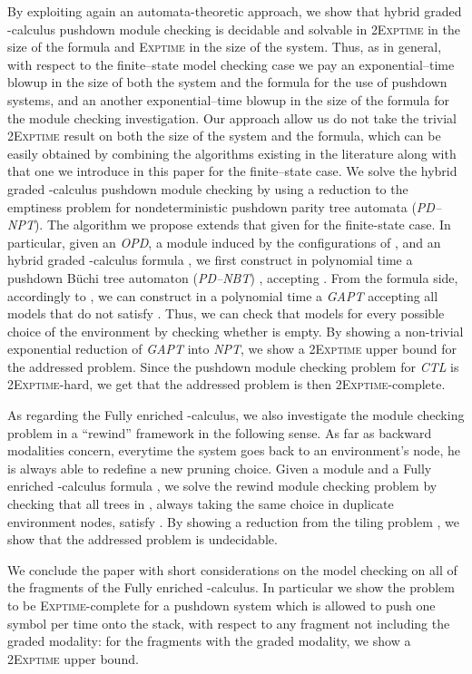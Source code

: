 \documentclass{LMCS}
\theoremstyle{plain}
\def \CTL           {\emph{CTL}\xspace}
\def \EXPTIME       {\textsc{Exptime}\xspace}
\def \GAPT          {\emph{GAPT}\xspace}
\def \NPT           {\emph{NPT}\xspace}
\def \OPD           {\emph{OPD}\xspace}
\def \PDNBT         {\emph{PD--NBT}\xspace}
\def \PDNPT         {\emph{PD--NPT}\xspace}
\def \TGAPT         {\emph{GAPT}\xspace}
\def \TWOEXPTIME    {\textsc{2Exptime}\xspace}
\begin{document}
By exploiting again an automata-theoretic approach, we show that hybrid graded
-calculus pushdown module checking is decidable and solvable in
\TWOEXPTIME in the size of the formula and \EXPTIME in the size of the system.
Thus, as in general, with respect to the finite--state model checking case we
pay an exponential--time blowup in the size of both the system and the formula
for the use of pushdown systems, and an another exponential--time blowup in the
size of the formula for the module checking investigation. Our approach allow
us do not take the trivial \TWOEXPTIME result on both the size of the system
and the formula, which can be easily obtained by combining the algorithms
existing in the literature along with that one we introduce in this paper for
the finite--state case. We solve the hybrid graded -calculus pushdown
module checking by using a reduction to the emptiness problem for
nondeterministic pushdown parity tree automata (\PDNPT). The algorithm we
propose extends that given for the finite-state case. In particular, given an
\OPD , a module  induced by the configurations of , and an hybrid
graded -calculus formula , we first construct in polynomial time
a pushdown B\"uchi tree automaton (\PDNBT) , accepting .
From the formula side, accordingly to \cite{BLMV06}, we can construct in a
polynomial time a \GAPT  accepting all models that
do not satisfy . Thus, we can check that  models  for
every possible choice of the environment by checking whether  is empty. By showing a non-trivial exponential
reduction of \TGAPT into \NPT, we show a \TWOEXPTIME upper bound for the
addressed problem. Since the pushdown module checking problem for \CTL is
\TWOEXPTIME-hard, we get that the addressed problem is then
\TWOEXPTIME-complete.


As regarding the Fully enriched -calculus, we also investigate the module
checking problem in a ``rewind'' framework in the following sense. As far as
backward modalities concern, everytime the system goes back to an environment's
node, he is always able to redefine a new pruning choice. Given a module 
and a Fully enriched -calculus formula , we solve the rewind
module checking problem by checking that all trees in , always taking
the same choice in duplicate environment nodes, satisfy . By showing a
reduction from the tiling problem \cite{Ber66}, we show that the addressed
problem is undecidable.

We conclude the paper with short considerations on the model
checking on all of the fragments of the Fully enriched
-calculus. In particular we show the problem to be
\EXPTIME-complete for a pushdown system which is allowed to push
one symbol per time onto the stack, with respect to any fragment
not including the graded modality: for the fragments with the
graded modality, we show a \TWOEXPTIME upper bound.
\end{document}
